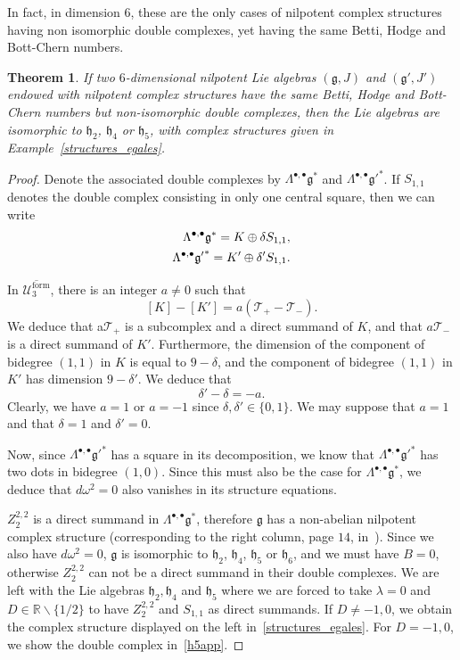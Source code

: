 \documentclass[leqno]{article}
\newtheorem{Theorem}[equation]{Theorem}
\theoremstyle{definition}
\numberwithin{equation}{section}
\begin{document}
In fact, in dimension $6$, these are the only cases of nilpotent complex structures having non isomorphic double complexes, yet having the same Betti, Hodge and Bott-Chern numbers.
\begin{Theorem}
If two $6$-dimensional nilpotent Lie algebras $(\mathfrak{g}, J)$ and $(\mathfrak{g}', J')$ endowed with nilpotent complex structures have the same Betti, Hodge and Bott-Chern numbers but non-isomorphic double complexes, then the Lie algebras are isomorphic to $\mathfrak{h}_2$, $\mathfrak{h}_4$ or $\mathfrak{h}_5$, with complex structures given in Example~\ref{structures_egales}.
\end{Theorem}
\begin{proof}
Denote the associated double complexes by $\Lambda^{\bullet, \bullet}\mathfrak{g}^*$ and $\Lambda^{\bullet, \bullet}\mathfrak{g'}^*$.
If $S_{1, 1}$ denotes the double complex consisting in only one central square, then we can write
\[
\aligned
\Lambda^{\bullet, \bullet}\mathfrak{g}^* = K \oplus \delta S_{1, 1}, \\
\Lambda^{\bullet, \bullet}\mathfrak{g'}^* = K' \oplus \delta ' S_{1, 1}.
\endaligned
\]

In $\overline{\mathcal{U}^{\text{form}}_3}$, there is an integer $a \neq 0$ such that
\[
[K] 
-
[K']
=
a(\mathcal{T}_+ - \mathcal{T}_-).
\]
We deduce that a$\mathcal{T}_+$ is a subcomplex and a direct summand of $K$, and that $a\mathcal{T}_-$ is a direct summand of $K'$. Furthermore, the dimension of the component of bidegree $(1, 1)$ in $K$ is equal to $9 - \delta$, and the component of bidegree $(1, 1)$ in $K'$ has dimension $9 - \delta'$. We deduce that
\[
\delta' - \delta
=
-a.
\]
Clearly, we have $a = 1$ or $a= -1$ since $\delta, \delta' \in \{0, 1\}$. We may suppose that $a = 1$ and that $\delta = 1$ and $\delta' = 0$.

Now, since $\Lambda^{\bullet, \bullet}\mathfrak{g'}^*$ has a square in its decomposition, we know that $\Lambda^{\bullet, \bullet}\mathfrak{g'}^*$ has two dots in bidegree $(1, 0)$. Since this must also be the case for $\Lambda^{\bullet, \bullet}\mathfrak{g}^*$, we deduce that $d\omega^2=0$ also vanishes in its structure equations. 

$Z^{2, 2}_2$ is a direct summand in $\Lambda^{\bullet, \bullet}\mathfrak{g}^*$, therefore $\mathfrak{g}$ has a non-abelian nilpotent complex structure (corresponding to the right column, page $14$, in~\cite{COUV}). Since we also have $d\omega^2=0$, $\mathfrak{g}$ is isomorphic to $\mathfrak{h}_2$, $\mathfrak{h}_4$, $\mathfrak{h}_5$ or $\mathfrak{h}_6$, and we must have $B=0$, otherwise $Z^{2, 2}_2$ can not be a direct summand in their double complexes. We are left with the Lie algebras $\mathfrak{h}_2, \mathfrak{h}_4$ and $\mathfrak{h}_5$ where we are forced to take $\lambda = 0$ and $D \in \mathbb{R} \backslash \{1/2\}$ to have $Z^{2, 2}_2$ and $S_{1, 1}$ as direct summands. If $D \neq -1, 0$, we obtain the complex structure displayed on the left in~\ref{structures_egales}. For $D=-1, 0$, we show the double complex in~\ref{h5app}. 


\end{proof}
\end{document}

